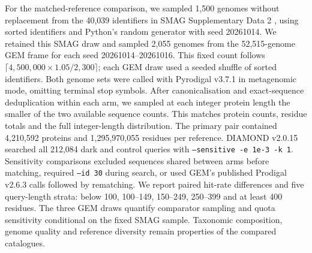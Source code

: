 For the matched-reference comparison, we sampled 1{,}500 genomes without replacement from the
40{,}039 identifiers in SMAG Supplementary Data 2 \citep{ma2023smag}, using sorted identifiers
and Python's random generator with seed 20261014. We retained this SMAG draw and sampled
2{,}055 genomes from the 52{,}515-genome GEM frame for each seed 20261014--20261016.
This fixed count follows $\lceil4{,}500{,}000\times1.05/2{,}300\rceil$; each GEM draw used a
seeded shuffle of sorted identifiers. Both genome sets were called with Pyrodigal v3.7.1
\citep{larralde2022pyrodigal} in metagenomic mode, omitting terminal stop symbols. After
canonicalisation and exact-sequence deduplication within each arm, we sampled at each integer
protein length the smaller of the two available sequence counts. This matches protein counts,
residue totals and the full integer-length distribution. The primary pair contained 4{,}210{,}592 proteins and 1{,}295{,}970{,}055 residues per reference. DIAMOND v2.0.15 searched all
212{,}084 dark and control queries with \texttt{--sensitive -e 1e-3 -k 1}.
Sensitivity comparisons excluded sequences shared between arms before matching, required
\texttt{--id 30} during search, or used GEM's published Prodigal v2.6.3 calls followed by
rematching. We report paired hit-rate differences and five query-length strata: below 100,
100--149, 150--249, 250--399 and at least 400 residues. The three GEM draws quantify comparator
sampling and quota sensitivity conditional on the fixed SMAG sample. Taxonomic composition,
genome quality and reference diversity remain properties of the compared catalogues.

